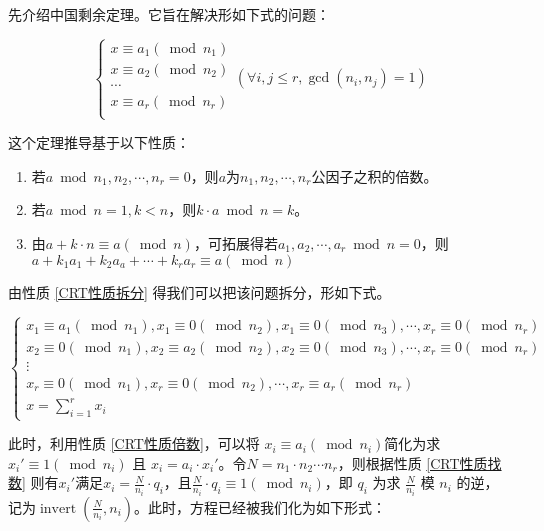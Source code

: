 \documentclass[a4paper]{article}         %
\newcommand{\upcite}[1]{\textsuperscript{\cite{#1}}} %
\begin{document}
先介绍中国剩余定理。它旨在解决形如下式的问题：

\begin{equation}
    \label{中国剩余定理问题方程组}
	\begin{cases}
		x \equiv a_1(\bmod n_1) \\
		x \equiv a_2(\bmod n_2) \\
		\cdots                  \\
		x \equiv a_r(\bmod n_r) \\
	\end{cases}
    (\forall i, j \leqslant r, \gcd(n_i, n_j) = 1)
\end{equation}

这个定理推导基于以下性质：

\begin{enumerate}
	\item \label{CRT性质找数} 若$a \bmod n_1,n_2, \cdots, n_r = 0$，则$a$为$n_1,n_2, \cdots, n_r$公因子之积的倍数。
	\item \label{CRT性质倍数} 若$a \bmod n = 1, k < n$，则$ k \cdot a \bmod n = k$。
	\item \label{CRT性质拆分} 由$a + k \cdot n \equiv a(\bmod n)$，可拓展得若$a_1,a_2,\cdots,a_r \bmod n = 0$，则$a + k_1a_1+k_2a_a+\cdots+k_ra_r \equiv a (\bmod n)$ %
\end{enumerate}

由性质 \ref{CRT性质拆分} 得我们可以把该问题拆分，形如下式。

\[
	\begin{cases}
		x_1 \equiv a_1(\bmod n_1), x_1 \equiv 0 (\bmod n_2), x_1 \equiv 0 (\bmod n_3), \cdots, x_r \equiv 0 (\bmod n_r)\\
		x_2 \equiv 0(\bmod n_1), x_2 \equiv a_2 (\bmod n_2), x_2 \equiv 0 (\bmod n_3), \cdots, x_r \equiv 0 (\bmod n_r)\\
		\vdots\\
		x_r \equiv 0(\bmod n_1), x_r \equiv 0 (\bmod n_2), \cdots, x_r \equiv a_r (\bmod n_r)\\
		x = \sum \limits_{i=1}^{r} x_i
	\end{cases}
\]

此时，利用性质 \ref{CRT性质倍数}，可以将 $x_i \equiv a_i(\bmod n_i)$简化为求$x_i' \equiv 1 (\bmod n_i)$ 且 $x_i = a_i \cdot x_i'$。令$N=n_1 \cdot n_2 \cdots n_r$，则根据性质 \ref{CRT性质找数} 则有$x_i'$满足$x_i = \frac{N}{n_i} \cdot q_i$，且$\frac{N}{n_i} \cdot q_i \equiv 1 (\bmod n_i)$，即 $q_i$ 为求 $\frac{N}{n_i}$ 模 $n_i$ 的逆，记为$\operatorname{invert}(\frac{N}{n_i}, n_i)$\upcite{中国剩余定理(CRT)}。此时，方程已经被我们化为如下形式：
\end{document}
